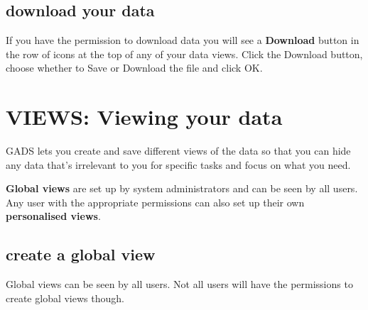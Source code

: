 \documentclass{ctrlo-int-toc}
\begin{document}
\subsection[download your data]{download your data}
If you have the permission to download data you will see a \textbf{Download} button in the row of icons at the top of any of your data views. Click the Download button, choose whether to Save or Download the file and click OK. 

\clearpage\section[VIEWS: Viewing your data]{VIEWS: Viewing your data}
\label{sec:views}
GADS lets you create and save different views of the data so that you can hide any data that's irrelevant to you for specific tasks and focus on what you need. 

\textbf{Global views} are set up by system administrators and can be seen by all users. Any user with the appropriate permissions can also set up their own \textbf{personalised views}.

\subsection[create a global view]{create a global view}
\label{subsec:globalview}
Global views can be seen by all users. Not all users will have the permissions to create global views though.
\end{document}
